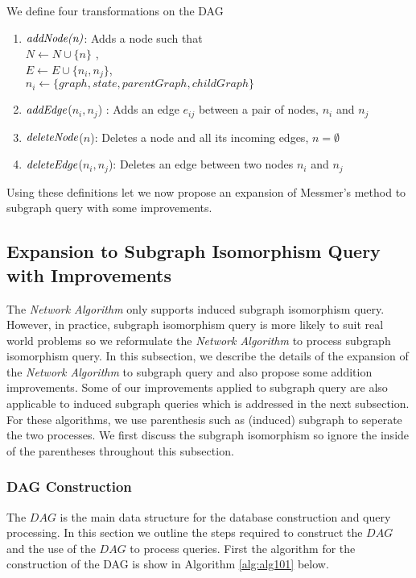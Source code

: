 We define four transformations on the DAG

\begin{enumerate}
\item $\emph{addNode(n)}$: Adds a node such that \\ 
$N\leftarrow N \cup \{n\}$ , \\ 
$E\leftarrow E \cup \{n_{i} ,n_{j}\}$, \\
$n_{i} \leftarrow  \{graph, state, parentGraph, childGraph\}$
\item $\emph{addEdge}$($n_{i} ,n_{j} $) : Adds an edge $e_{ij}$ between a pair of nodes, $n_i$ and  $n_j$
\item $\emph{deleteNode}$($n$): Deletes a node and all its incoming edges, $n=\emptyset$
\item $\emph{deleteEdge}$($n_{i} ,n_{j} $): Deletes an edge between two nodes $n_i$ and $n_j$
\end{enumerate}

Using these definitions let we now propose an expansion of Messmer's method to subgraph query with some improvements.

\subsection{Expansion to Subgraph Isomorphism Query with Improvements}
The \textit{Network Algorithm} only supports induced subgraph isomorphism query. However, in practice,  subgraph isomorphism query is more likely to suit
real world problems so we reformulate the \textit{Network Algorithm} to process subgraph isomorphism query.
In this subsection, we describe the details of the expansion of the \textit{Network Algorithm} to subgraph query and also propose some addition improvements.
Some of our improvements applied to subgraph query are also applicable to induced subgraph queries which is addressed in the next subsection.
For these algorithms, we use parenthesis such as (induced) subgraph to seperate the two processes. We first discuss the subgraph isomorphism so ignore the 
inside of the parentheses throughout this subsection.

\subsubsection{DAG Construction}
The $DAG$ is the main data structure for the database construction and query processing. In this section we outline the steps required to construct 
the $DAG$ and the use of the $DAG$ to process queries. First the algorithm for the construction of the DAG is show in Algorithm \ref{alg:alg101} below.


